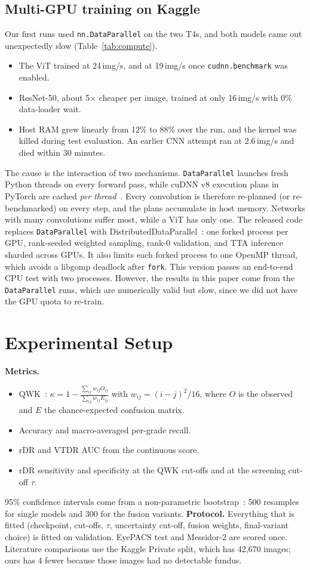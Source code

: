 \documentclass[conference,a4paper]{IEEEtran}
\begin{document}
\subsection{Multi-GPU training on Kaggle}\label{sec:ddp}
Our first runs used \texttt{nn.DataParallel} on the two T4s, and both models came out unexpectedly slow (Table~\ref{tab:compute}).
\begin{itemize}
\item The ViT trained at 24\,img/s, and at 19\,img/s once \texttt{cudnn.benchmark} was enabled.
\item ResNet-50, about 5$\times$ cheaper per image, trained at only 16\,img/s with 0\% data-loader wait.
\item Host RAM grew linearly from 12\% to 88\% over the run, and the kernel was killed during test evaluation. An earlier CNN attempt ran at 2.6\,img/s and died within 30 minutes.
\end{itemize}
The cause is the interaction of two mechanisms. \texttt{DataParallel} launches fresh Python threads on every forward pass, while cuDNN v8 execution plans in PyTorch are cached \emph{per thread}~\cite{prcache}.
Every convolution is therefore re-planned (or re-benchmarked) on every step, and the plans accumulate in host memory. Networks with many convolutions suffer most, while a ViT has only one.
The released code replaces \texttt{DataParallel} with DistributedDataParallel~\cite{ddp}: one forked process per GPU, rank-seeded weighted sampling, rank-0 validation, and TTA inference sharded across GPUs.
It also limits each forked process to one OpenMP thread, which avoids a libgomp deadlock after \texttt{fork}.
This version passes an end-to-end CPU test with two processes. However, the results in this paper come from the \texttt{DataParallel} runs, which are numerically valid but slow, since we did not have the GPU quota to re-train.

\section{Experimental Setup}
\textbf{Metrics.}
\begin{itemize}
\item QWK~\cite{cohen}: $\kappa = 1-\frac{\sum_{ij} w_{ij} O_{ij}}{\sum_{ij} w_{ij} E_{ij}}$ with $w_{ij}=(i-j)^2/16$, where $O$ is the observed and $E$ the chance-expected confusion matrix.
\item Accuracy and macro-averaged per-grade recall.
\item rDR and VTDR AUC from the continuous score.
\item rDR sensitivity and specificity at the QWK cut-offs and at the screening cut-off $\tau$.
\end{itemize}
95\% confidence intervals come from a non-parametric bootstrap~\cite{bootstrap}: 500 resamples for single models and 300 for the fusion variants.
\textbf{Protocol.} Everything that is fitted (checkpoint, cut-offs, $\tau$, uncertainty cut-off, fusion weights, final-variant choice) is fitted on validation. EyePACS test and Messidor-2 are scored once.
Literature comparisons use the Kaggle Private split, which has 42,670 images; ours has 4 fewer because those images had no detectable fundus.
\end{document}
